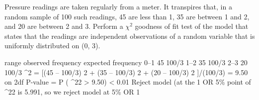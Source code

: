 \documentclass[a4paper,12pt]{article}
\begin{document}
Pressure readings are taken regularly from a meter. It transpires that, in a random
sample of 100 such readings, 45 are less than 1, 35 are between 1 and 2, and 20 are
between 2 and 3.
Perform a $\chi^2$ goodness of fit test of the model that states that the readings are
independent observations of a random variable that is uniformly distributed on (0, 3).

range
observed frequency
expected frequency
0–1
45
100/3
1–2
35
100/3
2–3
20
100/3
\chi^2 = [(45 – 100/3) 2 + (35 – 100/3) 2 + (20 – 100/3) 2 ]/(100/3) = 9.50 on 2df
P-value = P ( \chi^22 > 9.50) < 0.01
Reject model (at the 1%
OR 5\% point of \chi^22 is 5.991, so we reject model at 5\%
OR 1%
\end{document}

